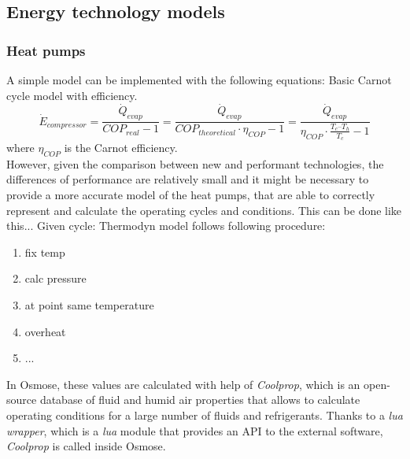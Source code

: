 \documentclass{article}
\begin{document}
\subsection{Energy technology models}

\subsubsection{Heat pumps}\label{ss:hp}
A simple model can be implemented with the following equations:
Basic Carnot cycle model with efficiency.
\begin{equation}
    \dot{E}_{compressor} = \frac{\dot{Q}_{evap}}{COP_{real}-1} = \frac{\dot{Q}_{evap}}{COP_{theoretical} \cdot \eta_{COP} - 1} = \frac{\dot{Q}_{evap}}{\eta_{COP} \cdot \frac{T_{c} – T_{h}}{T_{c}} -1} 
\end{equation}
where $\eta_{COP}$ is the Carnot efficiency.\\

However, given the comparison between new and performant technologies, the differences of performance are relatively small and it might be necessary to provide a more accurate model of the heat pumps, that are able to correctly represent and calculate the operating cycles and conditions. This can be done like this...
Given cycle:
Thermodyn model follows following procedure:
\begin{enumerate}
    \item fix temp
    \item calc pressure
    \item at point same temperature
    \item overheat
    \item ...
\end{enumerate}

In Osmose, these values are calculated with help of \textit{Coolprop}, which is an open-source database of fluid and humid air properties that allows to calculate operating conditions for a large number of fluids and refrigerants. Thanks to a \textit{lua wrapper}, which is a \textit{lua} module that provides an API to the external software, \textit{Coolprop} is called inside Osmose.
\end{document}
